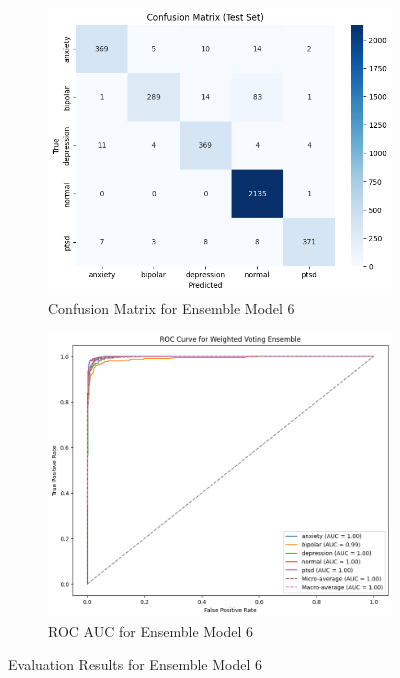 \begin{figure}[h!]
    \centering
    \begin{subfigure}[b]{0.49\textwidth}
        \centering
        \includegraphics[width=\textwidth]{Images/WV CM.png}
        \caption{Confusion Matrix for Ensemble Model 6}
        \label{wv cm}  %
    \end{subfigure}
    \hfill
    \begin{subfigure}[b]{0.49\textwidth}
        \centering
        \includegraphics[width=\textwidth]{Images/WV ROC.png}
        \caption{ROC AUC for Ensemble Model 6}
        \label{wv roc}  %
    \end{subfigure}
    \caption{Evaluation Results for Ensemble Model 6}
    \label{fig:ensemble_model6_comparison}
\end{figure}

